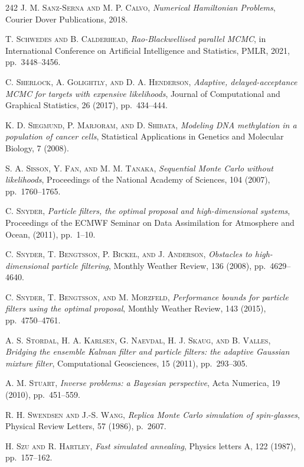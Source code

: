 \begin{thebibliography}{242}
\textsc{J. M. Sanz-Serna and M. P. Calvo},
\textit{Numerical Hamiltonian Problems},
Courier Dover Publications, 2018.

\textsc{T. Schwedes and B. Calderhead},
\textit{Rao-Blackwellised parallel MCMC},
in International Conference on Artificial Intelligence and Statistics, PMLR, 2021, pp.\ 3448--3456.

\textsc{C. Sherlock, A. Golightly, and D. A. Henderson},
\textit{Adaptive, delayed-acceptance MCMC for targets with expensive likelihoods},
Journal of Computational and Graphical Statistics, 26 (2017), pp.\ 434--444.

\textsc{K. D. Siegmund, P. Marjoram, and D. Shibata},
\textit{Modeling DNA methylation in a population of cancer cells},
Statistical Applications in Genetics and Molecular Biology, 7 (2008).

\textsc{S. A. Sisson, Y. Fan, and M. M. Tanaka},
\textit{Sequential Monte Carlo without likelihoods},
Proceedings of the National Academy of Sciences, 104 (2007), pp.\ 1760--1765.

\textsc{C. Snyder},
\textit{Particle filters, the optimal proposal and high-dimensional systems},
Proceedings of the ECMWF Seminar on Data Assimilation for Atmosphere and Ocean, (2011), pp.\ 1--10.

\textsc{C. Snyder, T. Bengtsson, P. Bickel, and J. Anderson},
\textit{Obstacles to high-dimensional particle filtering},
Monthly Weather Review, 136 (2008), pp.\ 4629--4640.

\textsc{C. Snyder, T. Bengtsson, and M. Morzfeld},
\textit{Performance bounds for particle filters using the optimal proposal},
Monthly Weather Review, 143 (2015), pp.\ 4750--4761.

\textsc{A. S. Stordal, H. A. Karlsen, G. Naevdal, H. J. Skaug, and B. Valles},
\textit{Bridging the ensemble Kalman filter and particle filters: the adaptive Gaussian mixture filter},
Computational Geosciences, 15 (2011), pp.\ 293--305.

\textsc{A. M. Stuart},
\textit{Inverse problems: a Bayesian perspective},
Acta Numerica, 19 (2010), pp.\ 451--559.

\textsc{R. H. Swendsen and J.-S. Wang},
\textit{Replica Monte Carlo simulation of spin-glasses},
Physical Review Letters, 57 (1986), p.\ 2607.

\textsc{H. Szu and R. Hartley},
\textit{Fast simulated annealing},
Physics letters A, 122 (1987), pp.\ 157--162.


\end{thebibliography}
